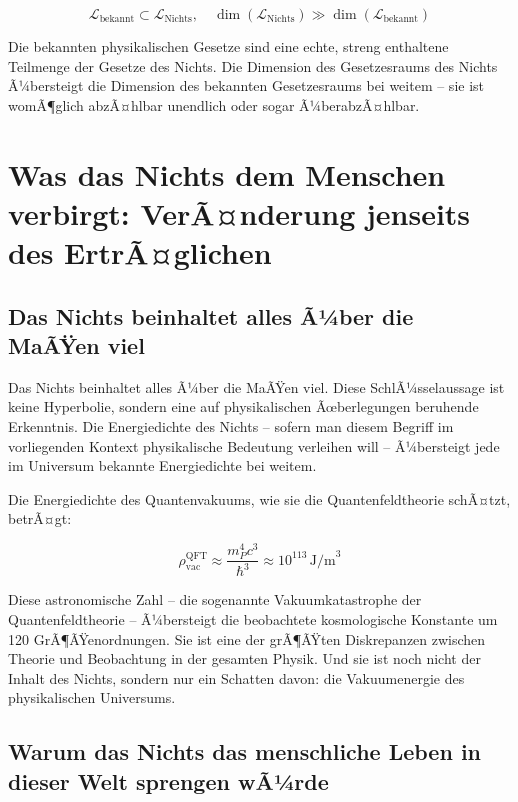 ﻿\documentclass[12pt,a4paper]{report}
\begin{document}
\begin{equation}
	\mathcal{L}_{\text{bekannt}} \subset \mathcal{L}_{\text{Nichts}}, \quad \dim(\mathcal{L}_{\text{Nichts}}) \gg \dim(\mathcal{L}_{\text{bekannt}})
	\label{eq:einbettung}
\end{equation}

Die bekannten physikalischen Gesetze sind eine echte, streng enthaltene Teilmenge der Gesetze des Nichts. Die Dimension des Gesetzesraums des Nichts Ã¼bersteigt die Dimension des bekannten Gesetzesraums bei weitem -- sie ist womÃ¶glich abzÃ¤hlbar unendlich oder sogar Ã¼berabzÃ¤hlbar.

\section{Was das Nichts dem Menschen verbirgt: VerÃ¤n\-derung jenseits des ErtrÃ¤glichen}

\subsection{Das Nichts beinhaltet alles Ã¼ber die MaÃŸen viel}

Das Nichts beinhaltet alles Ã¼ber die MaÃŸen viel. Diese SchlÃ¼sselaussage ist keine Hyperbolie, sondern eine auf physikalischen Ãœberlegungen beruhende Erkenntnis. Die Energiedichte des Nichts -- sofern man diesem Begriff im vorliegenden Kontext physikalische Bedeutung verleihen will -- Ã¼bersteigt jede im Universum bekannte Energiedichte bei weitem.

Die Energiedichte des Quantenvakuums, wie sie die Quantenfeldtheorie schÃ¤tzt, betrÃ¤gt:

\begin{equation}
	\rho_{\text{vac}}^{\text{QFT}} \approx \frac{m_P^4 c^3}{\hbar^3} \approx 10^{113}\,\text{J/m}^3
	\label{eq:vakuum_energie}
\end{equation}

Diese astronomische Zahl -- die sogenannte \glqq Vakuumkatastrophe\grqq{} der Quantenfeldtheorie -- Ã¼bersteigt die beobachtete kosmologische Konstante um 120 GrÃ¶ÃŸenordnungen. Sie ist eine der grÃ¶ÃŸten Diskrepanzen zwischen Theorie und Beobachtung in der gesamten Physik. Und sie ist noch nicht der Inhalt des Nichts, sondern nur ein Schatten davon: die Vakuumenergie des physikalischen Universums.

\subsection{Warum das Nichts das menschliche Leben in dieser Welt sprengen wÃ¼rde}
\end{document}
